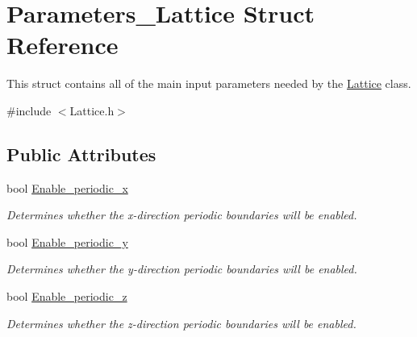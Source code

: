 \hypertarget{struct_parameters___lattice}{}\section{Parameters\+\_\+\+Lattice Struct Reference}
\label{struct_parameters___lattice}


This struct contains all of the main input parameters needed by the \hyperlink{class_lattice}{Lattice} class.  




{\ttfamily \#include $<$Lattice.\+h$>$}

\subsection*{Public Attributes}
\begin{DoxyCompactItemize}
\item 
\mbox{\label{struct_parameters___lattice_a922f7e39f7debc0bd06ec1f0f1ca8257}} 
bool \hyperlink{struct_parameters___lattice_a922f7e39f7debc0bd06ec1f0f1ca8257}{Enable\+\_\+periodic\+\_\+x}
\begin{DoxyCompactList}\small\item\em Determines whether the x-\/direction periodic boundaries will be enabled. \end{DoxyCompactList}\item 
\mbox{\label{struct_parameters___lattice_a9ee9c54330f7cd0bc32fd80e27ee87ff}} 
bool \hyperlink{struct_parameters___lattice_a9ee9c54330f7cd0bc32fd80e27ee87ff}{Enable\+\_\+periodic\+\_\+y}
\begin{DoxyCompactList}\small\item\em Determines whether the y-\/direction periodic boundaries will be enabled. \end{DoxyCompactList}\item 
\mbox{\label{struct_parameters___lattice_aff375c434a37560067d9cc677cff8052}} 
bool \hyperlink{struct_parameters___lattice_aff375c434a37560067d9cc677cff8052}{Enable\+\_\+periodic\+\_\+z}
\begin{DoxyCompactList}\small\item\em Determines whether the z-\/direction periodic boundaries will be enabled. \end{DoxyCompactList}\item 

\end{DoxyCompactItemize}
